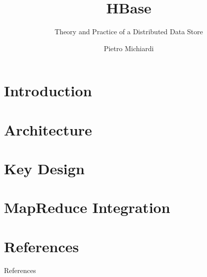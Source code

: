 \documentclass{beamer}
\title{HBase}
\subtitle{Theory and Practice of a Distributed Data Store}
\author{ Pietro Michiardi}
\institute{Eurecom}
\date
\begin{document}
\begin{frame}
  \titlepage
\end{frame}

\section{Introduction}


\section{Architecture}


\section{Key Design}


\section{MapReduce Integration}




\section{References}
\begin{frame}[allowframebreaks]{References}
 
 
\end{frame}
\end{document}
